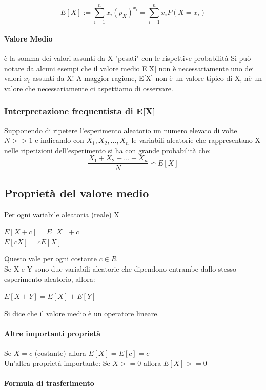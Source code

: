 \documentclass[12pt, a4paper, openany]{book}
\begin{document}
\begin{equation}
    E[X]:= \sum_{i = 1}^{n} x_i (p_X)^{x_i} = \sum_{i = 1}^{n} x_i P(X= x_i)
\end{equation}
\paragraph{Valore Medio} è la somma dei valori assunti da X "pesati" con le rispettive probabilità
Si può notare da alcuni esempi che il valore medio E[X] non è necessariamente
uno dei valori $x_i$ assunti da X!
A maggior ragione, E[X] non è un valore tipico di X, nè un valore che necessariamente
ci aspettiamo di osservare.
\subsubsection{Interpretazione frequentista di E[X]}
Supponendo di ripetere l'esperimento aleatorio un numero elevato di volte $N >> 1$
e indicando con $X_1, X_2, \dots, X_n$ le variabili aleatorie che rappresentano X nelle
ripetizioni dell'esperimento si ha con grande probabilità che:
\begin{equation}
    \frac{X_1 + X_2 + \dots + X_n}{N} \backsimeq  E[X]
\end{equation}

\subsection{Proprietà del valore medio}
Per ogni variabile aleatoria (reale) X
\begin{center}
    $E[X + c] = E[X] + c$
    \\$E[cX] = c E[X]$
\end{center}
Questo vale per ogni costante $c \in R$
\\ Se X e Y sono due variabili aleatorie che dipendono entrambe dallo
stesso esperimento aleatorio, allora:
\begin{center}
    $E[X+Y] = E[X] + E[Y]$
\end{center}
Si dice che il valore medio è un operatore lineare.
\paragraph{Altre importanti proprietà} Se $X = c$ (costante) allora
$E[X] = E[c] = c$
\\ Un'altra proprietà importante: Se $X >= 0$ allora $E[X] >= 0$
\paragraph{Formula di trasferimento} 
\end{document}

